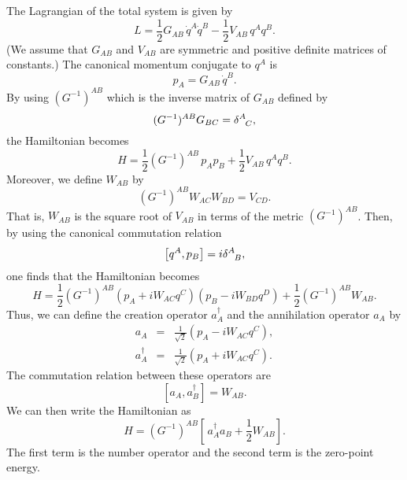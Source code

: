 The Lagrangian of the total system is given by
\begin{equation}
L=\frac{1}{2} G_{AB}\,\dot{q}^A\dot{q}^B-
   \frac{1}{2} V_{AB}\,q^Aq^B.
\label{Lagra}
\end{equation}
(We assume that $G_{AB}$ and $V_{AB}$ are symmetric and
positive definite matrices of constants.)
The canonical momentum conjugate to $q^A$ is
\begin{equation}
 p_A=G_{AB}\,\dot{q}^B.
\end{equation}
By using $(G^{-1})^{AB}$ which is the inverse matrix of $G_{AB}$
defined by
\begin{equation}
  (G^{-1})^{AB}G_{BC}=\delta^A_{\Sp C},
\end{equation}
the Hamiltonian becomes
\begin{equation}
  H=\frac{1}{2}(G^{-1})^{AB} \,p_Ap_B+
   \frac{1}{2} V_{AB}\,q^Aq^B.
\end{equation}
Moreover, we define $W_{AB}$ by
\begin{equation}
(G^{-1})^{AB} W_{AC}W_{BD}=V_{CD}.
\end{equation}
That is, $W_{AB}$ is the square root of $V_{AB}$
in terms of the metric $(G^{-1})^{AB}$.
Then, by using the canonical commutation relation
\begin{equation}
  \left[ q^A,p_B \right] =i \delta^A_{\Sp B},
\end{equation}
one finds that the Hamiltonian becomes
\begin{equation}
H=\frac{1}{2}(G^{-1})^{AB}
  \left(p_A+iW_{AC}q^C\right)\left(p_B-iW_{BD}q^D\right)
   +\frac{1}{2}(G^{-1})^{AB}W_{AB}.
\end{equation}
Thus, we can define the creation operator $a^\dagger_A$ and
the annihilation operator $a_A$ by
\begin{eqnarray}
   a_A &=& \frac{1}{\sqrt{2}}\left(p_A-iW_{AC}q^C\right), \\
   a^\dagger_A &=& \frac{1}{\sqrt{2}}
                \left(p_A+iW_{AC}q^C\right).
\end{eqnarray}
The commutation relation between these operators are
\begin{equation}
  \left[ a_A, a^\dagger_B\right]=W_{AB}.
\end{equation}
We can then write the Hamiltonian as
\begin{equation}
  H=(G^{-1})^{AB}\left[\,a^\dagger_Aa_B+
      \frac{1}{2}W_{AB}\right].
\end{equation}
The first term is the number operator and
the second term is the zero-point energy.

